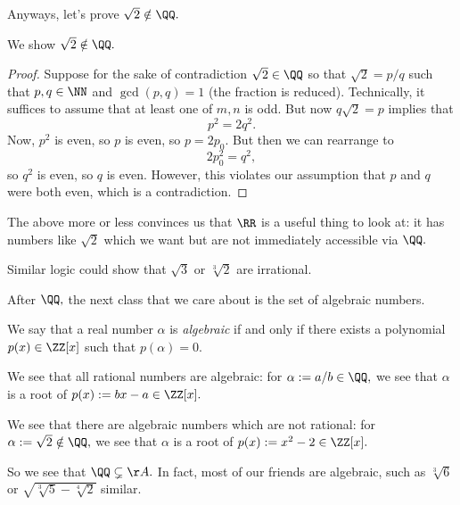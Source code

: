 Anyways, let's prove $\sqrt2\notin\QQ.$
\begin{prop} \label{prop:sqrt2}
    We show $\sqrt2\notin\QQ.$
\end{prop}
\begin{proof}
    Suppose for the sake of contradiction $\sqrt2\in\QQ$ so that $\sqrt2=p/q$ such that $p,q\in\NN$ and $\gcd(p,q)=1$ (the fraction is reduced). Technically, it suffices to assume that at least one of $m,n$ is odd. But now $q\sqrt2=p$ implies that
    \[p^2=2q^2.\]
    Now, $p^2$ is even, so $p$ is even, so $p=2p_0.$ But then we can rearrange to
    \[2p_0^2=q^2,\]
    so $q^2$ is even, so $q$ is even. However, this violates our assumption that $p$ and $q$ were both even, which is a contradiction.
\end{proof}
\begin{remark}
    The above more or less convinces us that $\RR$ is a useful thing to look at: it has numbers like $\sqrt2$ which we want but are not immediately accessible via $\QQ.$
\end{remark}
Similar logic could show that $\sqrt3$ or $\sqrt[3]2$ are irrational.

After $\QQ,$ the next class that we care about is the set of algebraic numbers.
\begin{defi}[Algebraic]
    We say that a real number $\alpha$ is \textit{algebraic} if and only if there exists a polynomial $p(x)\in\ZZ[x]$ such that $p(\alpha)=0.$
\end{defi}
\begin{ex}
    We see that all rational numbers are algebraic: for $\alpha:=a/b\in\QQ,$ we see that $\alpha$ is a root of $p(x):=bx-a\in\ZZ[x].$
\end{ex}
\begin{ex}
    We see that there are algebraic numbers which are not rational: for $\alpha:=\sqrt2\notin\QQ,$ we see that $\alpha$ is a root of $p(x):=x^2-2\in\ZZ[x].$
\end{ex}
So we see that $\QQ\subsetneq\AA.$ In fact, most of our friends are algebraic, such as $\sqrt[3]6$ or $\sqrt{\sqrt[3]5-\sqrt[4]2}$ similar.

